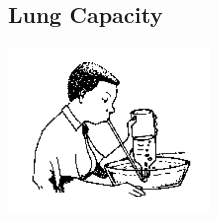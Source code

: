 \pagebreak


\subsection{Lung Capacity}

\begin{center}
\includegraphics[width=0.4\textwidth]{./img/source/lung-capacity.png}
\end{center}

